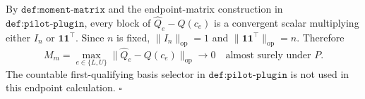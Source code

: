 By \(\texttt{def:moment-matrix}\) and the endpoint-matrix construction in \(\texttt{def:pilot-plugin}\), every block of \(\widehat Q_e-Q(c_e)\) is a convergent scalar multiplying either \(I_n\) or \(\mathbf 1\mathbf 1^{\top}\).  Since \(n\) is fixed,
\(
 \lVert I_n\rVert_{\mathrm{op}}=1
\)
and
\(
 \lVert\mathbf 1\mathbf 1^{\top}\rVert_{\mathrm{op}}=n
\).
Therefore
\[
 M_m=\max_{e\in\{L,U\}}
 \lVert\widehat Q_e-Q(c_e)\rVert_{\mathrm{op}}
 \longrightarrow0
 \quad\text{almost surely under }P.
\]
The countable first-qualifying basis selector in \(\texttt{def:pilot-plugin}\) is not used in this endpoint calculation. \(\square\)